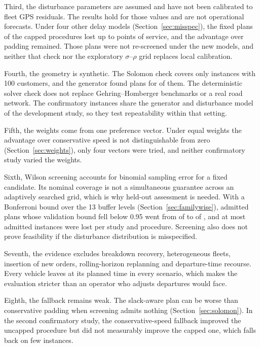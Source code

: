 \documentclass[11pt,a4paper]{article}
\begin{document}
Third, the disturbance parameters are assumed and have not been calibrated to
fleet GPS residuals. The results hold for those values and are not operational
forecasts. Under four other delay models (Section~\ref{sec:misspec}), the fixed
plans of the capped procedures lost up to \MisCappedDrop{} points of service,
and the advantage over padding remained. Those plans were not
re-screened under the new models, and neither that check nor the exploratory
$\sigma$--$\rho$ grid replaces local calibration.

Fourth, the geometry is synthetic. The Solomon check covers only \SolomonN{}
instances with 100 customers, and the generator found plans for \SolomonPlans{}
of them. The deterministic solver check does not replace Gehring--Homberger
benchmarks or a real road network. The confirmatory instances share the generator
and disturbance model of the development study, so they test repeatability within
that setting.

Fifth, the weights come from one preference vector. Under equal weights the
advantage over conservative speed is not distinguishable from zero
(Section~\ref{sec:weights}), only four vectors were tried, and neither
confirmatory study varied the weights.

Sixth, Wilson screening accounts for binomial sampling error for a fixed
candidate. Its nominal coverage is not a simultaneous guarantee across an
adaptively searched grid, which is why held-out assessment is needed. With a
Bonferroni bound over the 13 buffer levels (Section~\ref{sec:familywise}),
admitted plans whose validation bound fell below 0.95 went from \FwMissOrig{} of
\FwAdmittedOrig{} to \FwMissFw{} of \FwAdmittedTotal{}, and at most
\FwLostMax{} admitted instances were lost per study and procedure. Screening also
does not prove feasibility if the disturbance distribution is misspecified.

Seventh, the evidence excludes breakdown recovery, heterogeneous fleets, insertion
of new orders, rolling-horizon replanning and departure-time recourse. Every
vehicle leaves at its planned time in every scenario, which makes the evaluation
stricter than an operator who adjusts departures would face.

Eighth, the fallback remains weak. The slack-aware plan can be worse than
conservative padding when screening admits nothing (Section~\ref{sec:solomon}).
In the second confirmatory study, the conservative-speed fallback improved the
uncapped procedure but did not measurably improve the capped one, which falls
back on few instances.
\end{document}
